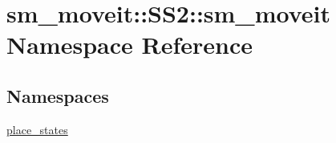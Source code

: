 \hypertarget{namespacesm__moveit_1_1SS2_1_1sm__moveit}{}\section{sm\+\_\+moveit\+:\+:S\+S2\+:\+:sm\+\_\+moveit Namespace Reference}
\label{namespacesm__moveit_1_1SS2_1_1sm__moveit}
\subsection*{Namespaces}
\begin{DoxyCompactItemize}
\item 
 \hyperlink{namespacesm__moveit_1_1SS2_1_1sm__moveit_1_1place__states}{place\+\_\+states}
\end{DoxyCompactItemize}
